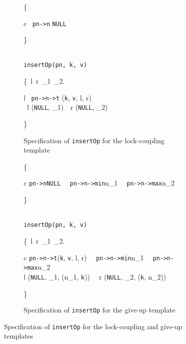 \documentclass[sigplan,10pt, screen]{acmart}
\begin{document}
\begin{figure*}[h]
	\begin{subfigure}{\textwidth}
		\centering
		\begin{mathpar}
			{\color{blue}
				\left\{ 
				\begin{array}{c}
					\ \texttt{pn->n} \mapsto \texttt{NULL}  
				\end{array}
				\right\}
			} \vspace{-0.85em} 
			\\ 
			\texttt{insertOp(pn, k, v)} 
			\vspace{-0.85em} 
			\\
			{\color{blue}
				\left\{\exists \  l\ r\ \mathit{lk}_1\ _2.
				\begin{array}{l}
					\ \texttt{pn->n->t} \mapsto (\texttt{k}, \texttt{v}, l, r) \ \ast \ \\ 
					\ l \mapsto (\texttt{NULL}, _1)\  \ast \ r \mapsto (\texttt{NULL}, \mathit{lk}_2)
				\end{array}
				\right\}
			}
		\end{mathpar}
		\caption{Specification of \texttt{insertOp} for the lock-coupling template}
		\label{fig:insertOp_lock}
	\end{subfigure}
	\begin{subfigure}{\textwidth}
		\begin{mathpar}
			{\color{blue}
				\left\{ 
				\begin{array}{c}
					\texttt{pn->n}\mapsto \texttt{NULL} \  \ast \ \texttt{pn->n->min}\mapsto n_1 \ \ast \ \texttt{pn->n->max}\mapsto n_2
				\end{array}
				\right\}
			} \vspace{-0.85em} 
			\\
			\texttt{insertOp(pn, k, v)}
			\vspace{-0.85em} 
			\\
			{\color{blue}
				\left\{\exists \ l\ r\ _1\ _2. 
				\begin{array}{c}
					\texttt{pn->n->t}\mapsto (\texttt{k}, \texttt{v}, l, r) \  \ast \ \texttt{pn->n->min}\mapsto n_1 \ \ast \ \texttt{pn->n->max}\mapsto n_2  \ \ast \ 
					\\ l \mapsto (\texttt{NULL}, _1, (n_1, \texttt{k})) \ \ast \ r \mapsto (\texttt{NULL}, \mathit{lk}_2, (\texttt{k}, n_2))
				\end{array}
				\right\}
			}
		\end{mathpar}
		\caption{Specification of \texttt{insertOp} for the give-up template}
		\label{fig:insertOp_giveup}
	\end{subfigure}
	\caption{Specification of \texttt{insertOp} for the lock-coupling and give-up templates}
	\label{fig:insertOp}
\end{figure*}
\end{document}
